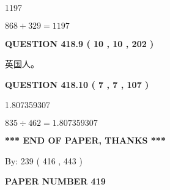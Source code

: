 \documentclass{ctexart}
\begin{document}
 
\noindent{}

1197
 
 
 
 
\noindent{}

$ %
868 +  %
329=   %
1197$
 
 
  
\vspace{0.2in}
  
{\textbf{\Large{QUESTION
418.9 
 ( 10 , 10 , 202 )
}}}
  
  
 
 
\noindent{}
 
 
英国人。
 
 
 
 
  
\vspace{0.2in}
  
{\textbf{\Large{QUESTION
418.10 
 ( 7 , 7 , 107 )
}}}
  
  
 
 
\noindent{}

1.807359307
 
 
 
 
\noindent{}

$ %
835 \div  %
462=   %
1.807359307$
 
 
   
   
 \vspace{0.2in}
 
   
   
   
   
\vspace{1.0in} 
{\textbf{\large{ *** END OF PAPER, THANKS *** }}} 
   
   
\hspace{1.0in} By: 
 239 ( 416 ,  443 )
   
   
   
   
\newpage 
\setcounter{page}{ 
   419001 } 
   
   
   
   
 {\textbf{ \Large{ PAPER NUMBER  419  }}}
   
   
\vspace{0.2in}
   
\end{document}
